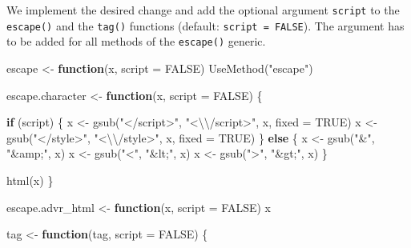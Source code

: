 \documentclass[
]{krantz}
\makeatletter
\newenvironment{Shaded}{\begin{snugshade}}{\end{snugshade}}
\newcommand{\CharTok}[1]{\textcolor[rgb]{0.31,0.60,0.02}{#1}}
\newcommand{\ControlFlowTok}[1]{\textcolor[rgb]{0.13,0.29,0.53}{\textbf{#1}}}
\newcommand{\DataTypeTok}[1]{\textcolor[rgb]{0.13,0.29,0.53}{#1}}
\newcommand{\KeywordTok}[1]{\textcolor[rgb]{0.13,0.29,0.53}{\textbf{#1}}}
\newcommand{\NormalTok}[1]{#1}
\newcommand{\OtherTok}[1]{\textcolor[rgb]{0.56,0.35,0.01}{#1}}
\newcommand{\StringTok}[1]{\textcolor[rgb]{0.31,0.60,0.02}{#1}}
\newenvironment{kframe}{%
\medskip{}
\setlength{\fboxsep}{.8em}
 \def\at@end@of@kframe{}%
 \ifinner\ifhmode%
  \def\at@end@of@kframe{\end{minipage}}%
  \begin{minipage}{\columnwidth}%
 \fi\fi%
 \def\FrameCommand##1{\hskip\@totalleftmargin \hskip-\fboxsep
 \colorbox{shadecolor}{##1}\hskip-\fboxsep
     \hskip-\linewidth \hskip-\@totalleftmargin \hskip\columnwidth}%
 \MakeFramed {\advance\hsize-\width
   \@totalleftmargin\z@ \linewidth\hsize
   \@setminipage}}%
 {\par\unskip\endMakeFramed%
 \at@end@of@kframe}
\renewenvironment{Shaded}{\begin{kframe}}{\end{kframe}}
\renewcommand{\KeywordTok} [1]{\textcolor[rgb]{0.00,0.44,0.13}{{#1}}}
\renewcommand{\DataTypeTok}[1]{\textcolor[rgb]{0.56,0.13,0.00}{{#1}}}
\renewcommand{\CharTok}    [1]{\textcolor[rgb]{0.25,0.44,0.63}{{#1}}}
\renewcommand{\StringTok}  [1]{\textcolor[rgb]{0.25,0.44,0.63}{{#1}}}
\renewcommand{\OtherTok}   [1]{\textcolor[rgb]{0.00,0.44,0.13}{{#1}}}
\renewcommand{\NormalTok}  [1]{{#1}}
\makeatother
\begin{document}
We implement the desired change and add the optional argument \texttt{script} to the \texttt{escape()} and the \texttt{tag()} functions (default: \texttt{script\ =\ FALSE}). The argument has to be added for all methods of the \texttt{escape()} generic.

\begin{Shaded}
\begin{Highlighting}[]
\NormalTok{escape <-}\StringTok{ }\ControlFlowTok{function}\NormalTok{(x, }\DataTypeTok{script =} \OtherTok{FALSE}\NormalTok{) }\KeywordTok{UseMethod}\NormalTok{(}\StringTok{"escape"}\NormalTok{)}

\NormalTok{escape.character <-}\StringTok{ }\ControlFlowTok{function}\NormalTok{(x, }\DataTypeTok{script =} \OtherTok{FALSE}\NormalTok{) \{}
  
  \ControlFlowTok{if}\NormalTok{ (script) \{}
\NormalTok{    x <-}\StringTok{ }\KeywordTok{gsub}\NormalTok{(}\StringTok{"</script>"}\NormalTok{, }\StringTok{"<}\CharTok{\textbackslash{}\textbackslash{}}\StringTok{/script>"}\NormalTok{, x, }\DataTypeTok{fixed =} \OtherTok{TRUE}\NormalTok{)}
\NormalTok{    x <-}\StringTok{ }\KeywordTok{gsub}\NormalTok{(}\StringTok{"</style>"}\NormalTok{,  }\StringTok{"<}\CharTok{\textbackslash{}\textbackslash{}}\StringTok{/style>"}\NormalTok{,  x, }\DataTypeTok{fixed =} \OtherTok{TRUE}\NormalTok{)}
\NormalTok{  \} }\ControlFlowTok{else}\NormalTok{ \{}
\NormalTok{    x <-}\StringTok{ }\KeywordTok{gsub}\NormalTok{(}\StringTok{"&"}\NormalTok{, }\StringTok{"&amp;"}\NormalTok{, x)}
\NormalTok{    x <-}\StringTok{ }\KeywordTok{gsub}\NormalTok{(}\StringTok{"<"}\NormalTok{, }\StringTok{"&lt;"}\NormalTok{, x)}
\NormalTok{    x <-}\StringTok{ }\KeywordTok{gsub}\NormalTok{(}\StringTok{">"}\NormalTok{, }\StringTok{"&gt;"}\NormalTok{, x)}
\NormalTok{  \}}

  \KeywordTok{html}\NormalTok{(x)}
\NormalTok{\}}

\NormalTok{escape.advr_html <-}\StringTok{ }\ControlFlowTok{function}\NormalTok{(x, }\DataTypeTok{script =} \OtherTok{FALSE}\NormalTok{) x}


\NormalTok{tag <-}\StringTok{ }\ControlFlowTok{function}\NormalTok{(tag, }\DataTypeTok{script =} \OtherTok{FALSE}\NormalTok{) \{}
  

\end{Highlighting}
\end{Shaded}
\end{document}

